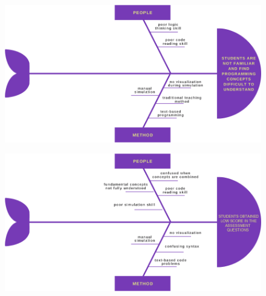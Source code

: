 \begin{doublespace}
\begin{center}
		\clearpage
		\null\vfill
		\begin{figure}[H]
			\centering
			\includegraphics[width=0.8\textheight,angle=90]{figures/fishbone1.png}
			\label{fig:fishbone1}
		\end{figure}
		\label{fishbone1}
		\vfill

		\clearpage
		\null\vfill
		\begin{figure}[H]
			\centering
			\includegraphics[width=0.8\textheight,angle=90]{figures/fishbone2.png}
			\label{fig:fishbone2}
		\end{figure}
		\label{fishbone2}
		\vfill


\end{center}
\end{doublespace}
